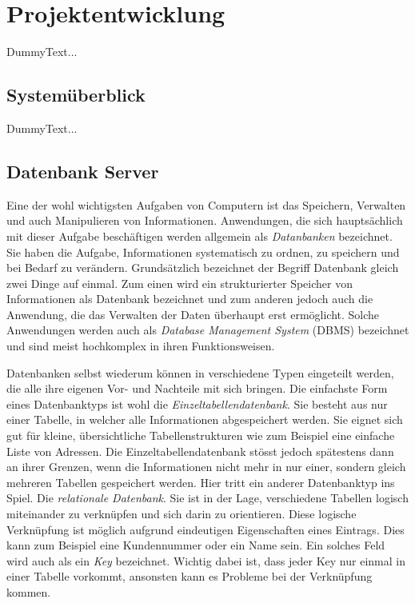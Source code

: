 \documentclass[a4paper,11pt]{report}
\begin{document}
	
	\chapter{Projektentwicklung}
	DummyText...
		\section{Systemüberblick}
		DummyText...
		
			\section{Datenbank Server}
			Eine der wohl wichtigsten Aufgaben von Computern ist das Speichern, Verwalten und auch Manipulieren von Informationen. Anwendungen, die sich hauptsächlich mit dieser Aufgabe beschäftigen werden allgemein als \emph{Datanbanken} bezeichnet. Sie haben die Aufgabe, Informationen systematisch zu ordnen, zu speichern und bei Bedarf zu verändern. Grundsätzlich bezeichnet der Begriff Datenbank gleich zwei Dinge auf einmal. Zum einen wird ein strukturierter Speicher von Informationen als Datenbank bezeichnet und zum anderen jedoch auch die Anwendung, die das Verwalten der Daten überhaupt erst ermöglicht. Solche Anwendungen werden auch als \emph{Database Management System} (DBMS) bezeichnet und sind meist hochkomplex in ihren Funktionsweisen. \cite{IT-Handbuch}
			
			Datenbanken selbst wiederum können in  verschiedene Typen eingeteilt werden, die alle ihre eigenen Vor- und Nachteile mit sich bringen. Die einfachste Form eines Datenbanktyps ist wohl die \emph{Einzeltabellendatenbank}. Sie besteht aus nur einer Tabelle, in welcher alle Informationen abgespeichert werden. Sie eignet sich gut für kleine, übersichtliche Tabellenstrukturen wie zum Beispiel eine einfache Liste von Adressen. Die Einzeltabellendatenbank stösst jedoch spätestens dann an ihrer Grenzen, wenn die Informationen nicht mehr in nur einer, sondern gleich mehreren Tabellen gespeichert werden. Hier tritt ein anderer Datenbanktyp ins Spiel. Die \emph{relationale Datenbank}. Sie ist in der Lage, verschiedene Tabellen logisch miteinander zu verknüpfen und sich darin zu orientieren. Diese logische Verknüpfung ist möglich aufgrund eindeutigen Eigenschaften eines Eintrags. Dies kann zum Beispiel eine Kundennummer oder ein Name sein. Ein solches Feld wird auch als ein \emph{Key} bezeichnet. Wichtig dabei ist, dass jeder Key nur einmal in einer Tabelle vorkommt, ansonsten kann es Probleme bei der Verknüpfung kommen.\cite[S. 745 - 751]{IT-Handbuch}
\end{document}
